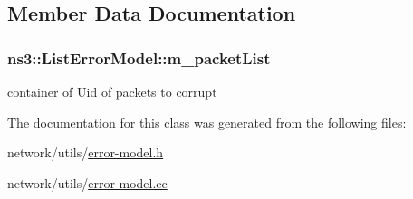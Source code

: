 \subsection{Member Data Documentation}
\subsubsection[{\texorpdfstring{m\+\_\+packet\+List}{m_packetList}}]{ ns3\+::\+List\+Error\+Model\+::m\+\_\+packet\+List\hspace{0.3cm}{\ttfamily [private]}}\hypertarget{classns3_1_1ListErrorModel_aa2e31c5887a6a1fe296dbacb6a4c3142}{}\label{classns3_1_1ListErrorModel_aa2e31c5887a6a1fe296dbacb6a4c3142}


container of Uid of packets to corrupt 



The documentation for this class was generated from the following files\+:\begin{DoxyCompactItemize}
\item 
network/utils/\hyperlink{error-model_8h}{error-\/model.\+h}\item 
network/utils/\hyperlink{error-model_8cc}{error-\/model.\+cc}\end{DoxyCompactItemize}
